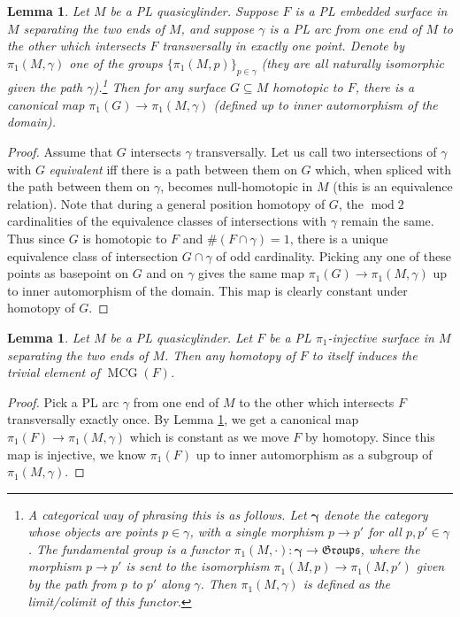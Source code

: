 \documentclass[12pt]{article}
\theoremstyle{plain}
\newtheorem{lemma}[theorem]{Lemma}
\theoremstyle{definition}
\theoremstyle{remark}
\numberwithin{equation}{section}
\begin{document}
\begin{lemma}\label{arcconst}
Let $M$ be a PL quasicylinder.  Suppose $F$ is a PL embedded surface in $M$ separating the two ends of $M$, and suppose $\gamma$ is a PL arc from one end of $M$ to the other which intersects $F$ transversally in exactly one point.  Denote by $\pi_1(M,\gamma)$ one of the groups $\{\pi_1(M,p)\}_{p\in\gamma}$ (they are all \emph{naturally} isomorphic given the path $\gamma$).\footnote{A categorical way of phrasing this is as follows.  Let $\boldsymbol\gamma$ denote the category whose objects are points $p\in\gamma$, with a single morphism $p\to p'$ for all $p,p'\in\gamma$.  The fundamental group is a functor $\pi_1(M,\cdot):\boldsymbol\gamma\to\mathfrak G\mathfrak r\mathfrak o\mathfrak u\mathfrak p\mathfrak s$, where the morphism $p\to p'$ is sent to the isomorphism $\pi_1(M,p)\to\pi_1(M,p')$ given by the path from $p$ to $p'$ along $\gamma$.  Then $\pi_1(M,\gamma)$ is defined as the limit/colimit of this functor.}  Then for any surface $G\subseteq M$ homotopic to $F$, there is a canonical map $\pi_1(G)\to\pi_1(M,\gamma)$ (defined up to inner automorphism of the domain).
\end{lemma}

\begin{proof}
Assume that $G$ intersects $\gamma$ transversally.  Let us call two intersections of $\gamma$ with $G$ \emph{equivalent} iff there is a path between them on $G$ which, when spliced with the path between them on $\gamma$, becomes null-homotopic in $M$ (this is an equivalence relation).  Note that during a general position homotopy of $G$, the $\operatorname{mod}2$ cardinalities of the equivalence classes of intersections with $\gamma$ remain the same.  Thus since $G$ is homotopic to $F$ and $\#(F\cap\gamma)=1$, there is a unique equivalence class of intersection $G\cap\gamma$ of odd cardinality.  Picking any one of these points as basepoint on $G$ and on $\gamma$ gives the same map $\pi_1(G)\to\pi_1(M,\gamma)$ up to inner automorphism of the domain.  This map is clearly constant under homotopy of $G$.
\end{proof}

\begin{lemma}\label{uniquemcg}
Let $M$ be a PL quasicylinder.  Let $F$ be a PL $\pi_1$-injective surface in $M$ separating the two ends of $M$.  Then any homotopy of $F$ to itself induces the trivial element of $\operatorname{MCG}(F)$.
\end{lemma}

\begin{proof}
Pick a PL arc $\gamma$ from one end of $M$ to the other which intersects $F$ transversally exactly once.  By Lemma \ref{arcconst}, we get a canonical map $\pi_1(F)\to\pi_1(M,\gamma)$ which is constant as we move $F$ by homotopy.  Since this map is injective, we know $\pi_1(F)$ up to inner automorphism as a subgroup of $\pi_1(M,\gamma)$.
\end{proof}
\end{document}
